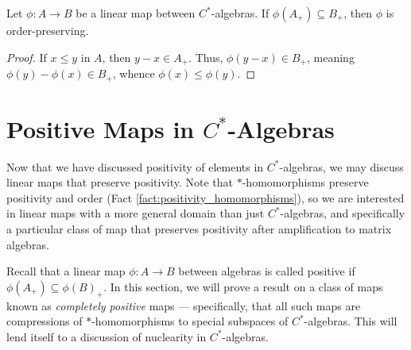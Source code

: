 \begin{corollary}\label{cor:positive_map_order_preserving}
  Let $\phi\colon A\rightarrow B$ be a linear map between $C^{\ast}$-algebras. If $\phi\left( A_{+} \right)\subseteq B_{+}$, then $\phi$ is order-preserving.
\end{corollary}
\begin{proof}
  If $x\leq y$ in $A$, then $y-x\in A_{+}$. Thus, $\phi\left( y-x \right)\in B_{+}$, meaning $\phi\left( y \right)-\phi\left( x \right)\in B_{+}$, whence $\phi\left( x \right)\leq \phi\left( y \right)$.
\end{proof}

\section{Positive Maps in \texorpdfstring{$C^{\ast}$-Algebras}{C*-Algebras}}%
Now that we have discussed positivity of elements in $C^{\ast}$-algebras, we may discuss linear maps that preserve positivity. Note that $\ast$-homomorphisms preserve positivity and order (Fact \ref{fact:positivity_homomorphisms}), so we are interested in linear maps with a more general domain than just $C^{\ast}$-algebras, and specifically a particular class of map that preserves positivity after amplification to matrix algebras.\newline

Recall that a linear map $\phi\colon A\rightarrow B$ between algebras is called positive if $\phi\left( A_{+} \right)\subseteq \phi\left( B \right)_{+}$. In this section, we will prove a result on a class of maps known as \textit{completely positive} maps --- specifically, that all such maps are compressions of $\ast$-homomorphisms to special subspaces of $C^{\ast}$-algebras. This will lend itself to a discussion of nuclearity in $C^{\ast}$-algebras.\newline

